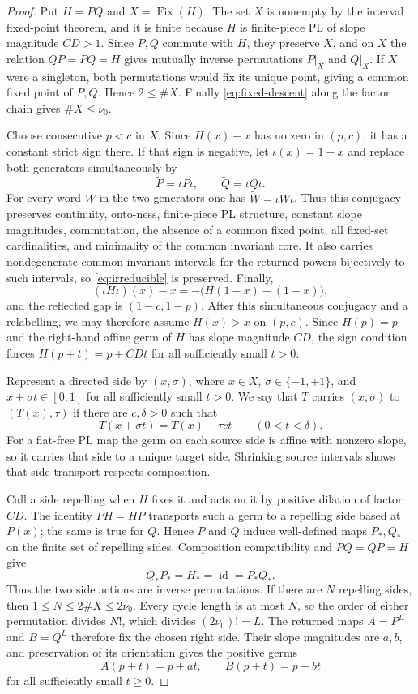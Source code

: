 \documentclass[11pt]{article}
\newcommand{\I}{[0,1]}
\newcommand{\Fix}{\operatorname{Fix}}
\newcommand{\id}{\operatorname{id}}
\begin{document}
\begin{proof}
Put $H=PQ$ and $X=\Fix(H)$. The set $X$ is nonempty by the interval fixed-point theorem, and it is
finite because $H$ is finite-piece PL of slope magnitude $CD>1$. Since $P,Q$ commute with $H$, they
preserve $X$, and on $X$ the relation $QP=PQ=H$ gives mutually inverse permutations
$P|_X$ and $Q|_X$. If $X$ were a singleton, both permutations would fix its unique point, giving a common
fixed point of $P,Q$. Hence $2\le\#X$. Finally \eqref{eq:fixed-descent} along the factor chain gives
$\#X\le\nu_0$.

Choose consecutive $p<c$ in $X$. Since $H(x)-x$ has no zero in $(p,c)$, it has a constant strict
sign there. If that sign is negative, let $\iota(x)=1-x$ and replace both generators simultaneously by
\[
\widetilde P=\iota P\iota,\qquad \widetilde Q=\iota Q\iota.
\]
For every word $W$ in the two generators one has $\widetilde W=\iota W\iota$. Thus this conjugacy
preserves continuity, onto-ness, finite-piece PL structure, constant slope magnitudes, commutation, the
absence of a common fixed point, all fixed-set cardinalities, and minimality of the common invariant
core. It also carries nondegenerate common invariant intervals for the returned powers bijectively to
such intervals, so \eqref{eq:irreducible} is preserved. Finally,
\[
(\iota H\iota)(x)-x=-\bigl(H(1-x)-(1-x)\bigr),
\]
and the reflected gap is $(1-c,1-p)$. After this simultaneous conjugacy and a relabelling, we may
therefore assume $H(x)>x$ on $(p,c)$. Since $H(p)=p$ and the right-hand affine germ of $H$ has
slope magnitude $CD$, the sign condition forces
$H(p+t)=p+CDt$ for all sufficiently small $t>0$.

Represent a directed side by $(x,\sigma)$, where $x\in X$, $\sigma\in\{-1,+1\}$, and
$x+\sigma t\in\I$ for all sufficiently small $t>0$. We say that $T$ carries $(x,\sigma)$ to
$(T(x),\tau)$ if there are $c,\delta>0$ such that
\[
T(x+\sigma t)=T(x)+\tau ct\qquad(0<t<\delta).
\]
For a flat-free PL map the germ on each source side is affine with nonzero slope, so it carries that
side to a unique target side. Shrinking source intervals shows that side transport respects composition.

Call a side repelling when $H$ fixes it and acts on it by positive dilation of factor $CD$. The identity
$PH=HP$ transports such a germ to a repelling side based at $P(x)$; the same is true for $Q$. Hence
$P$ and $Q$ induce well-defined maps $P_*,Q_*$ on the finite set of repelling sides. Composition
compatibility and $PQ=QP=H$ give
\[
Q_*P_*=H_*=\id=P_*Q_*.
\]
Thus the two side actions are inverse permutations. If there are $N$ repelling sides, then
$1\leq N\leq2\#X\leq2\nu_0$. Every cycle length is at most $N$, so the order of either permutation
divides $N!$, which divides $(2\nu_0)!=L$. The returned maps $A=P^L$ and $B=Q^L$ therefore fix the
chosen right side. Their slope magnitudes are $a,b$, and preservation of its orientation gives the
positive germs
\begin{equation}\label{eq:germs}
A(p+t)=p+at,\qquad B(p+t)=p+bt
\end{equation}
for all sufficiently small $t\ge0$.


\end{proof}
\end{document}
